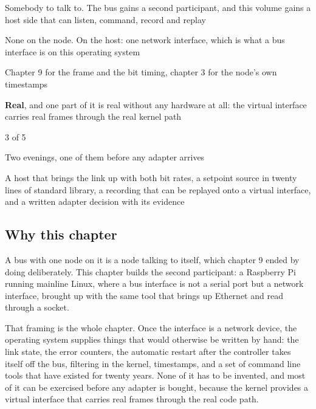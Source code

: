 
\begin{keyfacts}
\item[Adds to the node] Somebody to talk to. The bus gains a second participant, and this volume gains a host side that can listen, command, record and replay
\item[Peripherals] None on the node. On the host: one network interface, which is what a bus interface is on this operating system
\item[Depends on] Chapter 9 for the frame and the bit timing, chapter 3 for the node's own timestamps
\item[Real or modelled] \textbf{Real}, and one part of it is real without any hardware at all: the virtual interface carries real frames through the real kernel path
\item[Difficulty] 3 of 5
\item[Effort] Two evenings, one of them before any adapter arrives
\item[Deliverable] A host that brings the link up with both bit rates, a setpoint source in twenty lines of standard library, a recording that can be replayed onto a virtual interface, and a written adapter decision with its evidence
\end{keyfacts}

\subsection*{Why this chapter}

A bus with one node on it is a node talking to itself, which chapter 9 ended by
doing deliberately. This chapter builds the second participant: a Raspberry Pi
running mainline Linux, where a bus interface is not a serial port but a network
interface, brought up with the same tool that brings up Ethernet and read
through a socket.

That framing is the whole chapter. Once the interface is a network device, the
operating system supplies things that would otherwise be written by hand: the
link state, the error counters, the automatic restart after the controller takes
itself off the bus, filtering in the kernel, timestamps, and a set of command
line tools that have existed for twenty years. None of it has to be invented,
and most of it can be exercised before any adapter is bought, because the kernel
provides a virtual interface that carries real frames through the real code
path.

